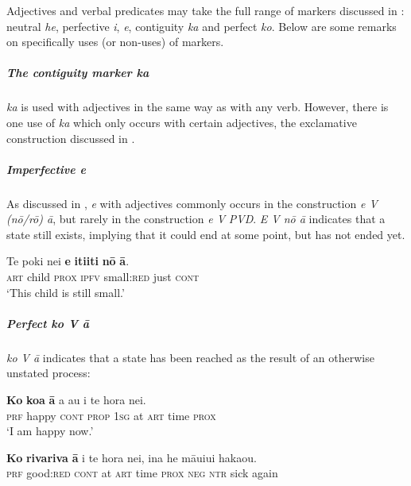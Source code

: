Adjectives and verbal predicates may take the full range of  markers discussed in : neutral \textit{he}, perfective \textit{i},  \textit{e}, contiguity \textit{ka} and perfect \textit{ko}. Below are some remarks on specifically  uses (or non-uses) of  markers.

\subparagraph{The contiguity marker \textit{ka}} \textit{ka} is used with adjectives in the same way as with any verb. However, there is one use of \textit{ka} which only occurs with certain adjectives, the exclamative construction discussed in .

\subparagraph{Imperfective \textit{e}} As discussed in , \textit{e} with adjectives commonly occurs in the construction \textit{e V (nō/rō) {\ꞌ}ā}, but rarely in the construction \textit{e V} \textit{PVD}. \textit{E V nō {\ꞌ}ā} indicates that a state still exists, implying that it could end at some point, but has not ended yet.

\ea\label{ex:3.99}
\gll Te poki nei \textbf{e} \textbf{{\ꞌ}iti{\ꞌ}iti} \textbf{nō} \textbf{{\ꞌ}ā}.\\
\textsc{art} child \textsc{prox} \textsc{ipfv} small:\textsc{red} just \textsc{cont}\\

\glt 
‘This child is still small.’ \textstyleExampleref{[R532-14.007]}
\z

\subparagraph{Perfect \textit{ko} \textit{V {\ꞌ}ā}} \textit{ko V {\ꞌ}ā} indicates that a state has been reached as the result of an otherwise unstated process:

\ea\label{ex:3.100}
\gll \textbf{Ko} \textbf{koa} \textbf{{\ꞌ}ā} a au {\ꞌ}i te hora nei. \\
\textsc{prf} happy \textsc{cont} \textsc{prop} \textsc{1sg} at \textsc{art} time \textsc{prox} \\

\glt 
‘I am happy now.’ \textstyleExampleref{[R214.053]} 
\z

\ea\label{ex:3.101}
\gll \textbf{Ko} \textbf{rivariva} \textbf{{\ꞌ}ā} {\ꞌ}i te hora nei, {\ꞌ}ina he māuiui haka{\ꞌ}ou.\\
\textsc{prf} good:\textsc{red} \textsc{cont} at \textsc{art} time \textsc{prox} \textsc{neg} \textsc{ntr} sick again\\

